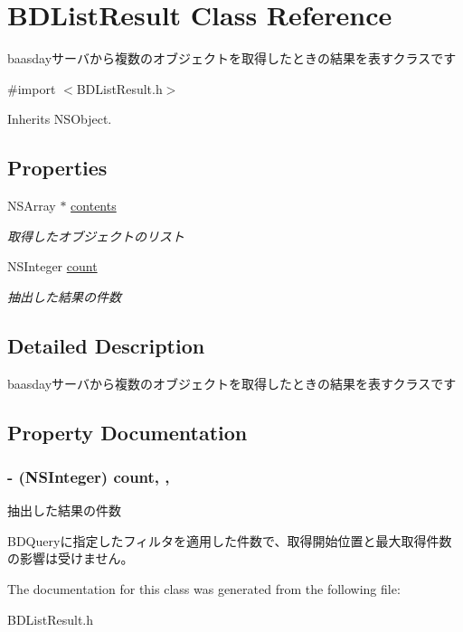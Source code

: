 \hypertarget{interface_b_d_list_result}{\section{B\-D\-List\-Result Class Reference}
\label{interface_b_d_list_result}
}


baasdayサーバから複数のオブジェクトを取得したときの結果を表すクラスです  




{\ttfamily \#import $<$B\-D\-List\-Result.\-h$>$}



Inherits N\-S\-Object.

\subsection*{Properties}
\begin{DoxyCompactItemize}
\item 
\hypertarget{interface_b_d_list_result_ac3d0683be0af2bbd52a4830e7bd8e49c}{N\-S\-Array $\ast$ \hyperlink{interface_b_d_list_result_ac3d0683be0af2bbd52a4830e7bd8e49c}{contents}}\label{interface_b_d_list_result_ac3d0683be0af2bbd52a4830e7bd8e49c}

\begin{DoxyCompactList}\small\item\em 取得したオブジェクトのリスト \end{DoxyCompactList}\item 
N\-S\-Integer \hyperlink{interface_b_d_list_result_aeb2cb3cece5df1286687d1e541b66be1}{count}
\begin{DoxyCompactList}\small\item\em 抽出した結果の件数 \end{DoxyCompactList}\end{DoxyCompactItemize}


\subsection{Detailed Description}
baasdayサーバから複数のオブジェクトを取得したときの結果を表すクラスです 

\subsection{Property Documentation}
\hypertarget{interface_b_d_list_result_aeb2cb3cece5df1286687d1e541b66be1}{
\subsubsection[{count}]{\setlength{\rightskip}{0pt plus 5cm}-\/ (N\-S\-Integer) count\hspace{0.3cm}{\ttfamily [read]}, {\ttfamily [atomic]}, {\ttfamily [assign]}}}\label{interface_b_d_list_result_aeb2cb3cece5df1286687d1e541b66be1}


抽出した結果の件数 

B\-D\-Queryに指定したフィルタを適用した件数で、取得開始位置と最大取得件数の影響は受けません。 

The documentation for this class was generated from the following file\-:\begin{DoxyCompactItemize}
\item 
B\-D\-List\-Result.\-h\end{DoxyCompactItemize}
